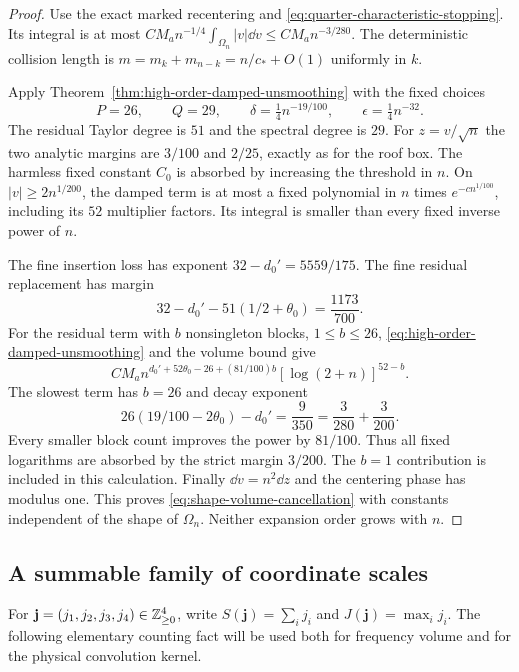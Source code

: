 \begin{proof}
Use the exact marked recentering and
\eqref{eq:quarter-characteristic-stopping}. Its integral is at most
$CM_a n^{-1/4}\int_{\Omega_n}|v|\dd v
\le CM_a n^{-3/280}$. The deterministic collision length is
$m=m_k+m_{n-k}=n/c_*+O(1)$ uniformly in $k$.

Apply Theorem~\ref{thm:high-order-damped-unsmoothing} with the fixed choices
\begin{equation}\label{eq:shape-expansion-orders}
 P=26,\qquad Q=29,\qquad
 \delta=\tfrac14n^{-19/100},\qquad
 \epsilon=\tfrac14n^{-32}.
\end{equation}
The residual Taylor degree is $51$ and the spectral degree is $29$.
For $z=v/\sqrt n$ the two analytic margins are $3/100$ and $2/25$,
exactly as for the roof box. The harmless fixed constant $C_0$ is
absorbed by increasing the threshold in $n$. On
$|v|\ge2n^{1/200}$, the damped term is at most a fixed polynomial in
$n$ times $e^{-cn^{1/100}}$, including its $52$ multiplier factors.
Its integral is smaller than every fixed inverse power of $n$.

The fine insertion loss has exponent
$32-d_0'=5559/175$. The fine residual replacement has margin
\begin{equation}\label{eq:shape-fine-margin}
 32-d_0'-51(1/2+\theta_0)=\frac{1173}{700}.
\end{equation}
For the residual term with $b$ nonsingleton blocks, $1\le b\le26$,
\eqref{eq:high-order-damped-unsmoothing} and the volume bound give
\[
 C M_a n^{d_0'+52\theta_0-26+(81/100)b}
                         [\log(2+n)]^{52-b}.
\]
The slowest term has $b=26$ and decay exponent
\begin{equation}\label{eq:shape-residual-margin}
 26(19/100-2\theta_0)-d_0'=\frac9{350}
                 =\frac3{280}+\frac3{200}.
\end{equation}
Every smaller block count improves the power by $81/100$. Thus all
fixed logarithms are absorbed by the strict margin $3/200$.
The $b=1$ contribution is included in this calculation. Finally
$\dd v=n^2\dd z$ and the centering phase has modulus one. This proves
\eqref{eq:shape-volume-cancellation} with constants independent of the
shape of $\Omega_n$. Neither expansion order grows with $n$.
\end{proof}

\subsection{A summable family of coordinate scales}
For $\mathbf j=(j_1,j_2,j_3,j_4)\in\mathbb Z_{\ge0}^4$, write
$S(\mathbf j)=\sum_i j_i$ and $J(\mathbf j)=\max_i j_i$.
The following elementary counting fact will be used both for frequency
volume and for the physical convolution kernel.

